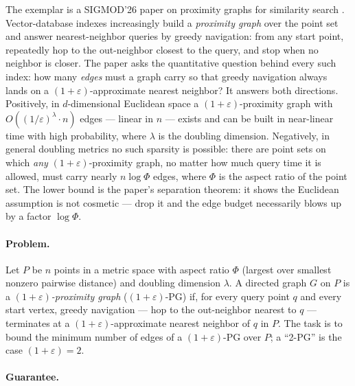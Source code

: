 The exemplar is a SIGMOD'26 paper on proximity graphs for similarity search
\citep{sigmod26-349}. Vector-database indexes increasingly build a \emph{proximity graph} over
the point set and answer nearest-neighbor queries by greedy navigation: from any start point,
repeatedly hop to the out-neighbor closest to the query, and stop when no neighbor is closer.
The paper asks the quantitative question behind every such index: how many \emph{edges} must a
graph carry so that greedy navigation always lands on a $(1+\varepsilon)$-approximate nearest
neighbor? It answers both directions. Positively, in $d$-dimensional Euclidean space a
$(1+\varepsilon)$-proximity graph with $O((1/\varepsilon)^{\lambda}\cdot n)$ edges --- linear in
$n$ --- exists and can be built in near-linear time with high probability, where $\lambda$ is
the doubling dimension. Negatively, in general doubling metrics no such sparsity is possible:
there are point sets on which \emph{any} $(1+\varepsilon)$-proximity graph, no matter how much
query time it is allowed, must carry nearly $n\log\Phi$ edges, where $\Phi$ is the aspect ratio
of the point set. The lower bound is the paper's separation theorem: it shows the Euclidean
assumption is not cosmetic --- drop it and the edge budget necessarily blows up by a factor
$\log\Phi$.

\paragraph{Problem.}
Let $P$ be $n$ points in a metric space with aspect ratio $\Phi$ (largest over smallest nonzero
pairwise distance) and doubling dimension $\lambda$. A directed graph $G$ on $P$ is a
\emph{$(1+\varepsilon)$-proximity graph} ($(1+\varepsilon)$-PG) if, for every query point $q$
and every start vertex, greedy navigation --- hop to the out-neighbor nearest to $q$ ---
terminates at a $(1+\varepsilon)$-approximate nearest neighbor of $q$ in $P$. The task is to
bound the minimum number of edges of a $(1+\varepsilon)$-PG over $P$; a ``2-PG'' is the case
$(1+\varepsilon)=2$.


\paragraph{Guarantee.}

